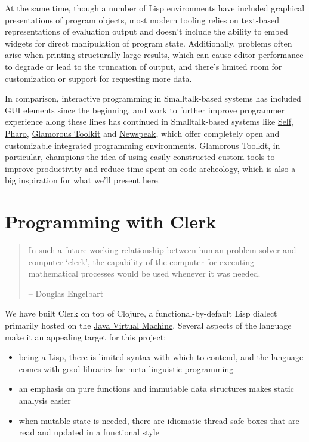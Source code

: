 \documentclass[sigconf,screen]{acmart}
\providecommand{\tightlist}{%
  \setlength{\itemsep}{0pt}\setlength{\parskip}{0pt}}
\begin{document}
At the same time, though a number of Lisp environments have included graphical presentations of program objects, most modern tooling relies on text-based representations of evaluation output and doesn't include the ability to embed widgets for direct manipulation of program state. Additionally, problems often arise when printing structurally large results, which can cause editor performance to degrade or lead to the truncation of output, and there's limited room for customization or support for requesting more data.

In comparison, interactive programming in Smalltalk-based systems has included GUI elements since the beginning, and work to further improve programmer experience along these lines has continued in Smalltalk-based systems like \href{https://selflanguage.org}{Self}, \href{https://pharo.org}{Pharo}, \href{https://gtoolkit.com}{Glamorous Toolkit} and \href{https://newspeaklanguage.org}{Newspeak}, which offer completely open and customizable integrated programming environments. Glamorous Toolkit, in particular, champions the idea of using easily constructed custom tools to improve productivity and reduce time spent on code archeology, which is also a big inspiration for what we'll present here.

\hypertarget{id}{%
\section{Programming with Clerk}\label{id}}

\begin{quote}
In such a future working relationship between human problem-solver and computer `clerk', the capability of the computer for executing mathematical processes would be used whenever it was needed.

-- Douglas Engelbart
\end{quote}

We have built Clerk on top of Clojure, a functional-by-default Lisp dialect primarily hosted on the \href{https://en.wikipedia.org/wiki/Java_virtual_machine}{Java Virtual Machine}. Several aspects of the language make it an appealing target for this project:

\begin{itemize}
\tightlist
\item
  being a Lisp, there is limited syntax with which to contend, and the language comes with good libraries for meta-linguistic programming
\item
  an emphasis on pure functions and immutable data structures makes static analysis easier
\item
  when mutable state is needed, there are idiomatic thread-safe boxes that are read and updated in a functional style
\end{itemize}
\end{document}
